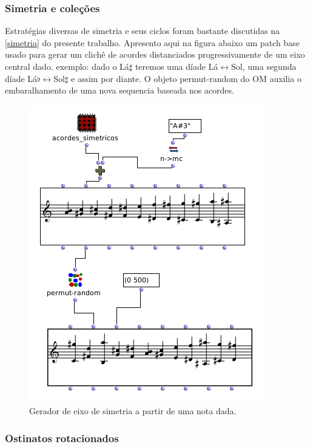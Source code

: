\documentclass[
	12pt,				%
	openright,			%
	twoside,			%
	a4paper,			%
	english,			%
	french,				%
	spanish,			%
	brazil				%
	]{abntex2}
\begin{document}
\subsubsection{Simetria e coleções }

Estratégias diversas de simetria e seus ciclos foram bastante discutidas na \autoref{simetria} do presente trabalho. Apresento aqui na figura abaixo um patch base usado para gerar um clichê de acordes distanciados progressivamente de um eixo central dado. exemplo: dado o Lá$\sharp$ teremos uma díade Lá$\leftrightarrow$Sol, uma segunda díade Lá$\flat \leftrightarrow$Sol$\sharp$ e assim por diante. O objeto permut-random do OM auxilia o embaralhamento de uma nova sequencia baseada nos acordes.

\begin{figure}[!h]
	\caption{\label{fig_grafico}Gerador de eixo de simetria a partir de uma nota dada. }
	\begin{center}
	    \includegraphics[scale=0.6]{OMPD/simetricos01.png}
	\end{center}
\end{figure}

\subsubsection{Ostinatos rotacionados}
\end{document}
